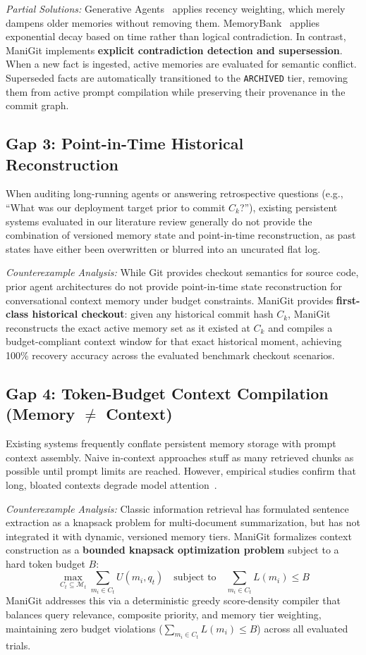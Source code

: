 \textit{Partial Solutions:} Generative Agents~\cite{park2023generative} applies recency weighting, which merely dampens older memories without removing them. MemoryBank~\cite{zhong2023memorybank} applies exponential decay based on time rather than logical contradiction. In contrast, ManiGit implements \textbf{explicit contradiction detection and supersession}. When a new fact is ingested, active memories are evaluated for semantic conflict. Superseded facts are automatically transitioned to the \texttt{ARCHIVED} tier, removing them from active prompt compilation while preserving their provenance in the commit graph.

\subsection{Gap 3: Point-in-Time Historical Reconstruction}
When auditing long-running agents or answering retrospective questions (e.g., ``What was our deployment target prior to commit $C_k$?''), existing persistent systems evaluated in our literature review generally do not provide the combination of versioned memory state and point-in-time reconstruction, as past states have either been overwritten or blurred into an uncurated flat log.

\textit{Counterexample Analysis:} While Git provides checkout semantics for source code, prior agent architectures do not provide point-in-time state reconstruction for conversational context memory under budget constraints. ManiGit provides \textbf{first-class historical checkout}: given any historical commit hash $C_k$, ManiGit reconstructs the exact active memory set as it existed at $C_k$ and compiles a budget-compliant context window for that exact historical moment, achieving 100\% recovery accuracy across the evaluated benchmark checkout scenarios.

\subsection{Gap 4: Token-Budget Context Compilation (Memory $\ne$ Context)}
Existing systems frequently conflate persistent memory storage with prompt context assembly. Naive in-context approaches stuff as many retrieved chunks as possible until prompt limits are reached. However, empirical studies confirm that long, bloated contexts degrade model attention~\cite{liu2024lost,dong2023bamboo}.

\textit{Counterexample Analysis:} Classic information retrieval has formulated sentence extraction as a knapsack problem for multi-document summarization, but has not integrated it with dynamic, versioned memory tiers. ManiGit formalizes context construction as a \textbf{bounded knapsack optimization problem} subject to a hard token budget $B$:
\begin{equation}
\max_{C_t \subseteq \mathcal{M}_t} \sum_{m_i \in C_t} U(m_i, q_t) \quad \text{subject to} \quad \sum_{m_i \in C_t} L(m_i) \le B
\end{equation}
ManiGit addresses this via a deterministic greedy score-density compiler that balances query relevance, composite priority, and memory tier weighting, maintaining zero budget violations ($\sum_{m_i \in C_t} L(m_i) \le B$) across all evaluated trials.


